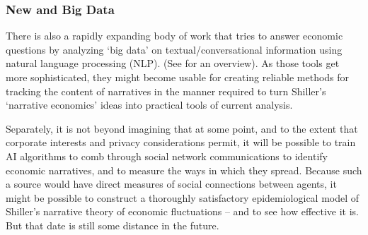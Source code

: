 \subsubsection{New and Big Data}
There is also a rapidly expanding body of work that tries to answer economic questions by analyzing `big data' on textual/conversational information using natural language processing (NLP).  (See \cite{gentzkow2019text} for an overview).  As those tools get more sophisticated, they might become usable for creating reliable methods for tracking the content of narratives in the manner required to turn Shiller's `narrative economics' ideas into practical tools of current analysis.

Separately, it is not beyond imagining that at some point, and to the extent that corporate interests and privacy considerations permit, it will be possible to train AI algorithms to comb through social network communications to identify economic narratives, and to measure the ways in which they spread.  Because such a source would have direct measures of social connections between agents, it might be possible to construct a thoroughly satisfactory epidemiological model of Shiller's narrative theory of economic fluctuations -- and to see how effective it is.  But that date is still some distance in the future.


